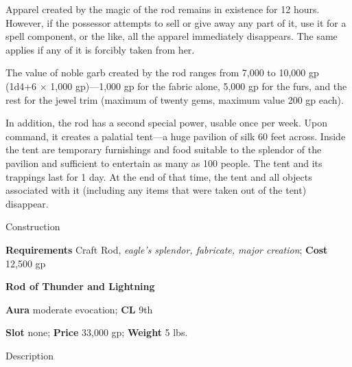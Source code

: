 Apparel created by the magic of the rod remains in existence for 12 hours. However, if the possessor attempts to sell or give away any part of it, use it for a spell component, or the like, all the apparel immediately disappears. The same applies if any of it is forcibly taken from her.
				
The value of noble garb created by the rod ranges from 7,000 to 10,000 gp (1d4+6 \mbox{$\times$} 1,000 gp)---1,000 gp for the fabric alone, 5,000 gp for the furs, and the rest for the jewel trim (maximum of twenty gems, maximum value 200 gp each).
				
In addition, the rod has a second special power, usable once per week. Upon command, it creates a palatial tent---a huge pavilion of silk 60 feet across. Inside the tent are temporary furnishings and food suitable to the splendor of the pavilion and sufficient to entertain as many as 100 people. The tent and its trappings last for 1 day. At the end of that time, the tent and all objects associated with it (including any items that were taken out of the tent) disappear. 
				
Construction
				
\textbf{Requirements} Craft Rod, \textit{eagle's splendor, fabricate, major creation}; \textbf{Cost }12,500 gp
				
\textbf{Rod of Thunder and Lightning}
				
\textbf{Aura} moderate evocation;\textbf{ CL }9th
				
\textbf{Slot} none; \textbf{Price} 33,000 gp; \textbf{Weight} 5 lbs.
				
Description
				
